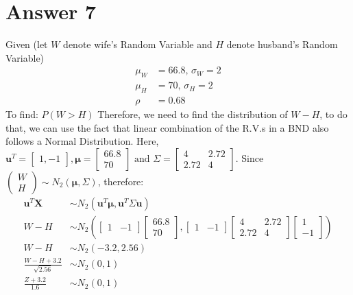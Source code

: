 \documentclass[a4paper]{article}
\begin{document}
\section{Answer 7}
Given (let $W$ denote wife's Random Variable and  $H$ denote husband's Random Variable)
\begin{equation*}
	\begin{split}
		\mu_W &=  66.8 \text{, } \sigma_W = 2\\
		\mu_H &= 70 \text{, } \sigma_H = 2\\
		\rho &= 0.68
	\end{split}
\end{equation*}
To find: $P\left( W > H \right) $
\newline\newline
Therefore, we need to find the distribution of $W - H$, to do that, we can use the fact that linear combination of the R.V.s in a BND also follows a Normal Distribution.
 \newline\newline
 Here, $\mathbf{u}^{T} = \begin{bmatrix}  1,-1 \end{bmatrix}, \mathbf{\mu} = \begin{bmatrix} 66.8\\70 \end{bmatrix} \text{ and }\Sigma = \begin{bmatrix} 4 & 2.72\\2.72&4 \end{bmatrix}  $.
 \newline\newline
 Since $\begin{pmatrix} W\\H \end{pmatrix} \sim N_2\left( \mathbf{\mu}, \Sigma \right) $, therefore:
 \begin{equation*}
 	\begin{split}
		\mathbf{u}^{T} \mathbf{X} &\sim N_2\left( \mathbf{u}^{T}\mathbf{\mu}, \mathbf{u}^{T}\Sigma\mathbf{u} \right)\\
		W - H &\sim N_2\left( \begin{bmatrix} 1&-1 \end{bmatrix} \begin{bmatrix} 66.8\\70 \end{bmatrix} , \begin{bmatrix} 1&-1 \end{bmatrix} \begin{bmatrix} 4&2.72\\2.72&4 \end{bmatrix} \begin{bmatrix} 1\\-1 \end{bmatrix}  \right)\\
	W-H	&\sim N_2\left( -3.2,2.56 \right)\\
	\frac{W-H+3.2}{\sqrt{2.56} } &\sim N_2\left( 0,1 \right)\\
	\frac{Z+3.2}{1.6} &\sim N_2\left( 0,1 \right) 
 	\end{split}
 \end{equation*}
\end{document}
